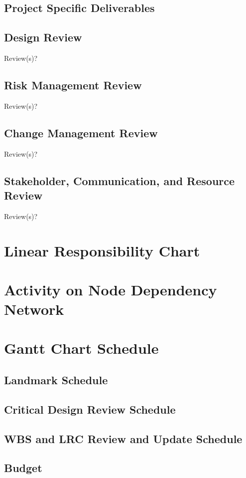 \subsection{Project Specific Deliverables}
\subsection{Design Review}
Review(s)?
\subsection{Risk Management Review}
Review(s)?
\subsection{Change Management Review}
Review(s)?
\subsection{Stakeholder, Communication, and Resource Review}
Review(s)?
\section{Linear Responsibility Chart}
\section{Activity on Node Dependency Network}
\section{Gantt Chart Schedule}
\subsection{Landmark Schedule}
\subsection{Critical Design Review Schedule}
\subsection{WBS and LRC Review and Update Schedule}
\subsection{Budget}
